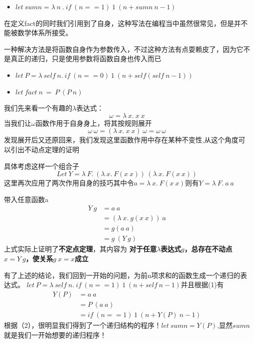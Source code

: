 \documentclass{article}
\begin{document}
		\begin{itemize}
			\item $let\ sumn=\lambda\ n\ .\ if\ (n==1)\ 1\ (n + sumn\ n-1)$
		\end{itemize}
	
		在定义fact的同时我们引用到了自身，这种写法在编程当中虽然很常见，但是并不能被数学体系所接受。
		
		一种解决方法是将函数自身作为参数传入，不过这种方法有点耍赖皮了，因为它不是真正的递归，只是使用参数将函数自身也传入而已
		\begin{itemize}
			\item $let\ P = \lambda\ self\ n.\ if\ (n == 0)\ 1\ (n+self(self\ n-1))$
			\item $let\ fact\ n\ =\ P\ (P\ n)$
		\end{itemize}
		我们先来看一个有趣的$\lambda$表达式： 
		$$\omega = \lambda\ x.\ x\ x$$
		当我们让$\omega$函数作用于自身身上，将其按规则展开
		$$\omega\ \omega = (\lambda\ x.\ x\ x)\ \omega = \omega\ \omega$$
		发现展开后又还原回来，我们发现这里函数作用中存在某种不变性,从这个角度可以引出不动点定理的证明
		
		具体考虑这样一个组合子
		$$Let\ Y = \lambda\ F.\ (\lambda\ x.\ F(x\ x))\ (\lambda\ x.\ F(x\ x))$$
		这里再次应用了两次作用自身的技巧其中令$a = \lambda\ x.\ F(x\ x)$则有$Y = \lambda\ F.\ a\ a$
		
		带入任意函数a
		\begin{equation}
		\begin{split}
		Y\ g & =  a\ a \\
			 & = (\lambda\ x.\ g(x\ x))\ a \\
			 & = g(a\ a)\\
			 & = g\ (Y\ g)
		\end{split}
		\end{equation}
		上式实际上证明了\textbf{不定点定理}，其内容为
		\textbf{对于任意$\lambda$表达式$g$，总存在不动点$x = Y\ g$，使关系$g\ x = x$成立}
		
		有了上述的结论，我们回到一开始的问题，为前n项求和的函数生成一个递归的表达式。
		$let\ P = \lambda\ self\ n.\ if\ (n==1)\ 1\ (n+self\ n-1)$并且根据(1)有		
		\begin{equation}
		\begin{split}
		Y (P)& =  a\ a \\
			& = P\ (a\ a)\\
			& = if\ (n==1)\ 1\ (n+Y(P)\ n-1)
		\end{split}
		\end{equation}
		根据（2），很明显我们得到了一个递归结构的程序！$let\ sumn=Y(P)$,显然$sumn$就是我们一开始想要的递归程序！
		
\end{document}
